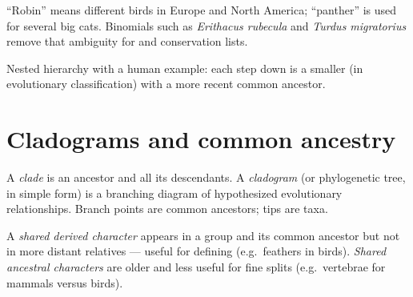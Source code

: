 \begin{example}
\label{ex:g10:biodiversity-classification:common-names}
``Robin'' means different birds in Europe and North America; ``panther'' is
used for several big cats. Binomials such as \emph{Erithacus rubecula} and
\emph{Turdus migratorius} remove that ambiguity for  and conservation
lists.
\end{example}

\begin{omfigure}

{\small Nested hierarchy with a human example: each step down is a smaller
 (in evolutionary classification) with a more recent common ancestor.}
\end{omfigure}

\section{Cladograms and common ancestry}

\begin{definition}\label{def:g10:biodiversity-classification:clade}
A \emph{clade} is an ancestor and all its descendants. A
\emph{cladogram} (or phylogenetic tree, in simple form)
is a branching diagram of hypothesized evolutionary relationships.
Branch points are common ancestors; tips are taxa.
\end{definition}

\begin{definition}\label{def:g10:biodiversity-classification:characters}
A \emph{shared derived character}
appears in a group and its common ancestor but not in more distant
relatives --- useful for defining  (e.g.\ feathers in birds).
\emph{Shared ancestral characters}
are older and less useful for fine splits (e.g.\ vertebrae for mammals
versus birds).
\end{definition}

